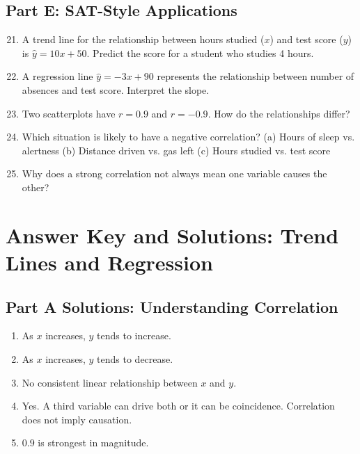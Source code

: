 \documentclass[12pt]{article}
\begin{document}
\subsection*{Part E: SAT-Style Applications}
\begin{enumerate}
  \setcounter{enumi}{20}
  \item A trend line for the relationship between hours studied (\(x\)) and test score (\(y\)) is \(\hat{y} = 10x + 50\). Predict the score for a student who studies 4 hours.
  \item A regression line \(\hat{y} = -3x + 90\) represents the relationship between number of absences and test score. Interpret the slope.
  \item Two scatterplots have \(r = 0.9\) and \(r = -0.9\). How do the relationships differ?
  \item Which situation is likely to have a negative correlation?  
  (a) Hours of sleep vs. alertness  
  (b) Distance driven vs. gas left  
  (c) Hours studied vs. test score
  \item Why does a strong correlation not always mean one variable causes the other?
\end{enumerate}

\newpage


\section*{Answer Key and Solutions: Trend Lines and Regression}

\subsection*{Part A Solutions: Understanding Correlation}
\begin{enumerate}
  \item As \(x\) increases, \(y\) tends to increase.
  \item As \(x\) increases, \(y\) tends to decrease.
  \item No consistent linear relationship between \(x\) and \(y\).
  \item Yes. A third variable can drive both or it can be coincidence. Correlation does not imply causation.
  \item \(0.9\) is strongest in magnitude.
\end{enumerate}
\end{document}
